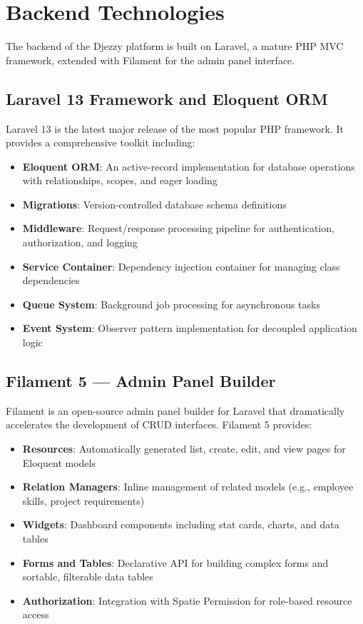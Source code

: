 \documentclass{bts-report}
\begin{document}
\section{Backend Technologies}

The backend of the Djezzy platform is built on Laravel, a mature PHP MVC framework, extended with Filament for the admin panel interface.

\subsection{Laravel 13 Framework and Eloquent ORM}
Laravel 13 is the latest major release of the most popular PHP framework. It provides a comprehensive toolkit including:
\begin{itemize}
  \item \textbf{Eloquent ORM}: An active-record implementation for database operations with relationships, scopes, and eager loading
  \item \textbf{Migrations}: Version-controlled database schema definitions
  \item \textbf{Middleware}: Request/response processing pipeline for authentication, authorization, and logging
  \item \textbf{Service Container}: Dependency injection container for managing class dependencies
  \item \textbf{Queue System}: Background job processing for asynchronous tasks
  \item \textbf{Event System}: Observer pattern implementation for decoupled application logic
\end{itemize}

\subsection{Filament 5 --- Admin Panel Builder}
Filament is an open-source admin panel builder for Laravel that dramatically accelerates the development of CRUD interfaces. Filament 5 provides:
\begin{itemize}
  \item \textbf{Resources}: Automatically generated list, create, edit, and view pages for Eloquent models
  \item \textbf{Relation Managers}: Inline management of related models (e.g., employee skills, project requirements)
  \item \textbf{Widgets}: Dashboard components including stat cards, charts, and data tables
  \item \textbf{Forms and Tables}: Declarative API for building complex forms and sortable, filterable data tables
  \item \textbf{Authorization}: Integration with Spatie Permission for role-based resource access
\end{itemize}
\end{document}
